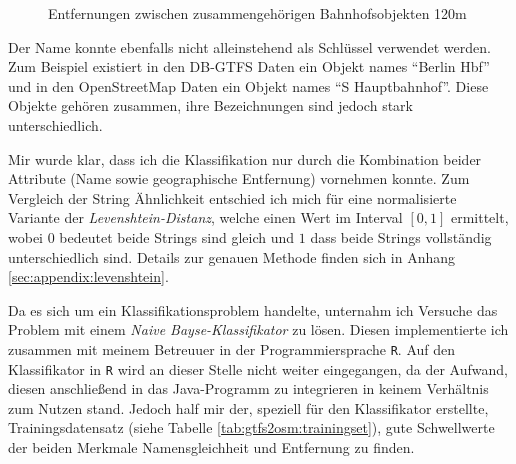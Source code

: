  \begin{figure}[htb]
   \centering
   \caption{Entfernungen zwischen zusammengehörigen Bahnhofsobjekten 120m}
   \label{fig:gtfs2osm:farLikelihood}
 \end{figure}
Der Name konnte ebenfalls nicht alleinstehend als Schlüssel verwendet werden. Zum Beispiel existiert in den DB-GTFS Daten ein Objekt names ``Berlin Hbf'' und in den OpenStreetMap Daten ein Objekt names ``S Hauptbahnhof''. Diese Objekte gehören zusammen, ihre Bezeichnungen sind jedoch stark unterschiedlich.

Mir wurde klar, dass ich die Klassifikation nur durch die Kombination beider Attribute (Name sowie geographische Entfernung) vornehmen konnte. Zum Vergleich der String Ähnlichkeit entschied ich mich für eine normalisierte Variante der \textit{Levenshtein-Distanz}, welche einen Wert im Interval $[0,1]$ ermittelt, wobei $0$ bedeutet beide Strings sind gleich und $1$ dass beide Strings vollständig unterschiedlich sind. Details zur genauen Methode finden sich in Anhang \ref{sec:appendix:levenshtein}.

Da es sich um ein Klassifikationsproblem handelte, unternahm ich Versuche das Problem mit einem \textit{Naive Bayse-Klassifikator} zu lösen.
Diesen implementierte ich zusammen mit meinem Betreuuer in der Programmiersprache \texttt{R}.
Auf den Klassifikator in \texttt{R} wird an dieser Stelle nicht weiter eingegangen, da der Aufwand, diesen anschließend in das Java-Programm zu integrieren in keinem Verhältnis zum Nutzen stand.
Jedoch half mir der, speziell für den Klassifikator erstellte, Trainingsdatensatz (siehe Tabelle \ref{tab:gtfs2osm:trainingset}), gute Schwellwerte der beiden Merkmale Namensgleichheit und Entfernung zu finden. 

